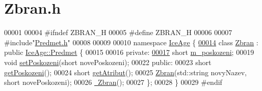 \hypertarget{Zbran_8h_source}{}\section{Zbran.\+h}
\label{Zbran_8h_source}

\begin{DoxyCode}
00001 
00004 \textcolor{preprocessor}{#ifndef ZBRAN\_H}
00005 \textcolor{preprocessor}{#define ZBRAN\_H}
00006 
00007 \textcolor{preprocessor}{#include"\hyperlink{Predmet_8h}{Predmet.h}"}
00008 
00009 
00010 \textcolor{keyword}{namespace }\hyperlink{namespaceIceAge}{IceAge} \{
\hypertarget{Zbran_8h_source.tex_l00014}{}\hyperlink{classIceAge_1_1Zbran}{00014}     \textcolor{keyword}{class }\hyperlink{classIceAge_1_1Zbran}{Zbran} : \textcolor{keyword}{public} \hyperlink{classIceAge_1_1Predmet}{IceAge::Predmet} \{
00015 
00016     \textcolor{keyword}{private}:
\hypertarget{Zbran_8h_source.tex_l00017}{}\hyperlink{classIceAge_1_1Zbran_a7a671b3caa7e80a70b5fce3d5b123418}{00017}         \textcolor{keywordtype}{short} \hyperlink{classIceAge_1_1Zbran_a7a671b3caa7e80a70b5fce3d5b123418}{m\_poskozeni};
00019         \textcolor{keywordtype}{void} \hyperlink{classIceAge_1_1Zbran_a1203c7042bea60e97f2032e922bba8f5}{setPoskozeni}(\textcolor{keywordtype}{short} novePoskozeni);
00022     \textcolor{keyword}{public}:
00023         \textcolor{keywordtype}{short} \hyperlink{classIceAge_1_1Zbran_ad12a2508c6983fad25c307a8b0b7d467}{getPoskozeni}();
00024         \textcolor{keywordtype}{short} \hyperlink{classIceAge_1_1Zbran_ae5be95775a3d4d3ac85b6a731dc35413}{getAtribut}();
00025         \hyperlink{classIceAge_1_1Zbran_a075c0a805d1fa11a79c795dcb65720d5}{Zbran}(std::string novyNazev, \textcolor{keywordtype}{short} novePoskozeni); 
00026         \hyperlink{classIceAge_1_1Zbran_abd3e919129605818d5aca1cc4e3c12c7}{~Zbran}();
00027     \};
00028 \}
00029 \textcolor{preprocessor}{#endif}
\end{DoxyCode}
